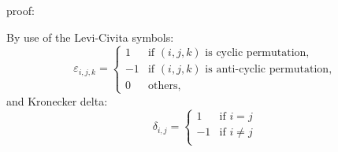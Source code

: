 proof:

By use of the Levi-Civita symbols:
\begin{equation}
\varepsilon_{i,j,k} =
\begin{cases}
1 & \text{if $(i,j,k)$ is cyclic permutation,}\\
-1 & \text{if $(i,j,k)$ is anti-cyclic permutation,}\\
0 & \text{others,}
\end{cases}
\end{equation}
and Kronecker delta:
\begin{equation}
\delta_{i,j} = \begin{cases}
1 & \text{if $i=j$}\\
-1 & \text{if $i\neq j$}\\
\end{cases}
\end{equation}



